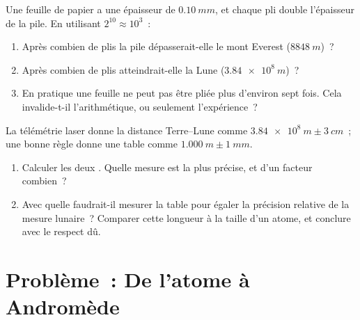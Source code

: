 \begin{exercise}[$\star\star\star$]\label{exo:g10:orders-of-magnitude:14}
Une feuille de papier a une épaisseur de $\qty{0.10}{mm}$, et chaque
pli double l'épaisseur de la pile. En utilisant $2^{10} \approx
10^{3}$~:
\begin{enumerate}
  \item Après combien de plis la pile dépasserait-elle le mont Everest
        ($\qty{8848}{m}$)~?
  \item Après combien de plis atteindrait-elle la Lune
        ($\qty{3.84e8}{m}$)~?
  \item En pratique une feuille ne peut pas être pliée plus d'environ
        sept fois. Cela invalide-t-il l'arithmétique, ou seulement
        l'expérience~?
\end{enumerate}
\end{exercise}

\begin{exercise}[$\star\star\star$]\label{exo:g10:orders-of-magnitude:15}
La télémétrie laser donne la distance Terre--Lune comme
$\qty{3.84e8}{m} \pm \qty{3}{cm}$~; une bonne règle donne une table
comme $\qty{1.000}{m} \pm \qty{1}{mm}$.
\begin{enumerate}
  \item Calculer les deux . Quelle mesure est
        la plus précise, et d'un facteur combien~?
  \item Avec quelle  faudrait-il mesurer la
        table pour égaler la précision relative de la mesure lunaire~?
        Comparer cette longueur à la taille d'un atome, et conclure
        avec le respect dû.
\end{enumerate}
\end{exercise}

\section{Problème~: De l'atome à Andromède}

